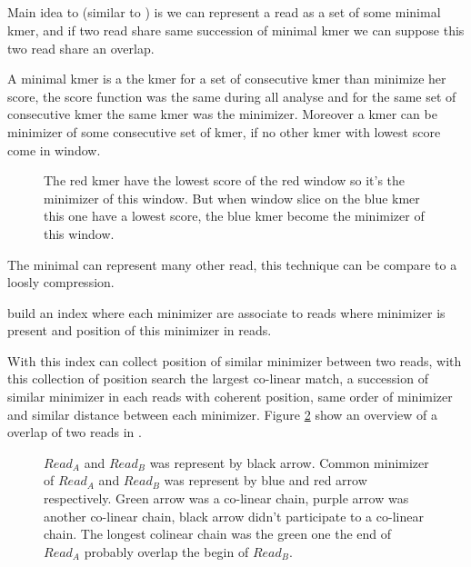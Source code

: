 \documentclass[main]{subfiles}
\begin{document}
\subsection{\minimap} \label{subsec:sota:miniasm:minimap}

Main idea to \minimap (similar to \mhap) is we can represent a read as a set of some minimal kmer, and if two read share same succession of minimal kmer we can suppose this two read share an overlap.

A minimal kmer is a the kmer for a set of consecutive kmer than minimize her score, the score function was the same during all analyse and for the same set of consecutive kmer the same kmer was the minimizer. Moreover a kmer can be minimizer of some consecutive set of kmer, if no other kmer with lowest score come in window. 

\begin{figure}[ht]
    \centering
    
    \caption{The red kmer have the lowest score of the red window so it's the minimizer of this window. But when window slice on the blue kmer this one have a lowest score, the blue kmer become the minimizer of this window.}
    \label{sota:fig:miniasm:minimizer}
\end{figure}

The minimal \kmer can represent many other read, this technique can be compare to a loosly compression.

\minimap build an index where each minimizer are associate to reads where minimizer is present and position of this minimizer in reads.

With this index \minimap can collect position of similar minimizer between two reads, with this collection of position \minimap search the largest co-linear match, a succession of similar minimizer in each reads with coherent position, same order of minimizer and similar distance between each minimizer. Figure \ref{sota:fig:miniasm:mapping} show an overview of a overlap of two reads in \minimap.

\begin{figure}[ht]
    \centering
    
    \caption{$Read_A$ and $Read_B$ was represent by black arrow. Common minimizer of $Read_A$ and $Read_B$ was represent by blue and red arrow respectively. Green arrow was a co-linear chain, purple arrow was another co-linear chain, black arrow didn't participate to a co-linear chain. The longest colinear chain was the green one the end of $Read_A$ probably overlap the begin of $Read_B$.}
    \label{sota:fig:miniasm:mapping}
\end{figure}
\end{document}
